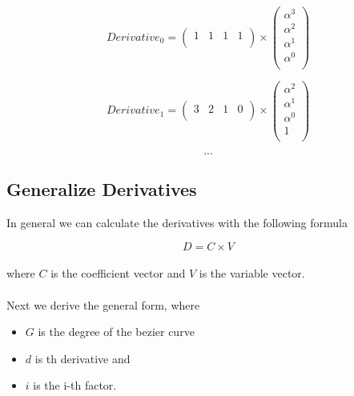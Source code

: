 \begin{equation*}
    Derivative_0=
    \left(
    \begin{array}{cccc}
        1 & 1 & 1 & 1 \\
    \end{array}
    \right)
    \times
    \left(
    \begin{array}{cccc}
        \alpha ^3 \\
        \alpha ^2 \\
        \alpha ^1 \\
        \alpha ^0 \\
    \end{array}
    \right)
\end{equation*}

\begin{equation*}
    Derivative_1=
    \left(
    \begin{array}{cccc}
        3 & 2 & 1 & 0 \\
    \end{array}
    \right)
    \times
    \left(
    \begin{array}{cccc}
        \alpha ^2 \\
        \alpha ^1 \\
        \alpha ^0 \\
        1         \\
    \end{array}
    \right)
\end{equation*}

\begin{equation*}
    ...
\end{equation*}

\subsection{Generalize Derivatives}

In general we can calculate the derivatives with the following formula

\begin{equation*}
    D=C \times V
\end{equation*}
\\
where $C$ is the coefficient vector and $V$ is the variable vector.\\
\\
Next we derive the general form, where

\begin{itemize}
    \item $G$ is the degree of the bezier curve
    \item $d$ is th derivative and
    \item $i$ is the i-th factor.
\end{itemize}

